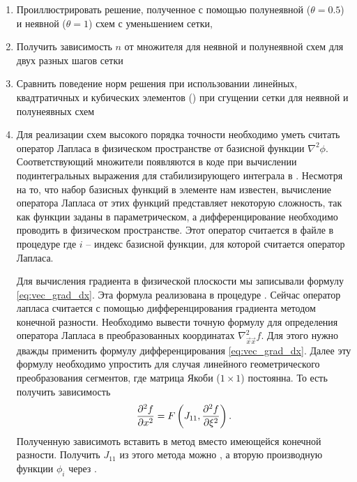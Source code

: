 \begin{enumerate}
\item Проиллюстрировать решение, полученное с помощью полунеявной ($\theta=0.5$) и неявной ($\theta=1$) схем с уменьшением сетки,
\item Получить зависимость $n$ от множителя  для неявной и полунеявной схем для двух разных шагов сетки
\item Сравнить поведение норм решения при использовании линейных, квадтратичных и кубических элементов () при 
      сгущении сетки для неявной и полунеявных схем
\item Для реализации схем высокого порядка точности необходимо уметь считать оператор Лапласа в физическом пространстве от базисной функции $\nabla^2 \phi$.
      Соответствующий множители  появляются в коде при вычислении подинтегральных выражения для стабилизирующего интеграла в .
      Несмотря на то, что набор базисных функций в элементе нам известен, вычисление оператора Лапласа от этих функций 
      представляет некоторую сложность, так как функции заданы в параметрическом, а дифференцирование необходимо проводить в физическом пространстве.
      Этот оператор считается в файле  в процедуре  где $i$ -- индекс базисной функции, для
      которой считается оператор Лапласа.

      Для вычисления градиента в физической плоскости мы записывали формулу \cref{eq:vec_grad_dx}. Эта формула реализована в процедуре .
      Сейчас оператор лапласа считается с помощью дифференцирования градиента методом конечной разности.
      Необходимо вывести точную формулу для определения оператора Лапласа в преобразованных координатах $\nabla^2_{\vec x\vec x} f$.
      Для этого нужно дважды применить формулу дифференцирования \cref{eq:vec_grad_dx}.
      Далее эту формулу необходимо упростить для случая линейного геометрического преобразования сегментов, где матрица Якоби ($1\times1$) постоянна.
      То есть получить зависимость
      \begin{equation*}
          \frac{\partial^2 f}{\partial x^2} = F\left(J_{11}, \frac{\partial^2 f}{\partial \xi^2}\right).
      \end{equation*}
      Полученную зависимоть вставить в метод  вместо имеющейся конечной разности.
      Получить $J_{11}$ из этого метода можно , а вторую производную функции $\phi_i$ через 
      .
\end{enumerate}
